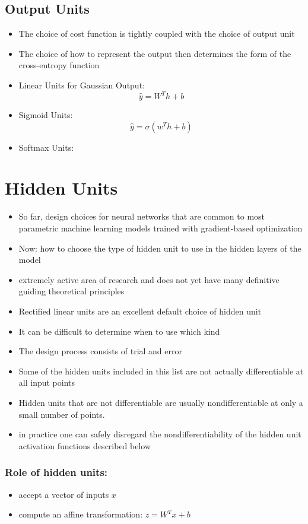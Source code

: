 \documentclass{beamer}
\begin{document}
\subsection{Output Units}
\begin{frame}
	\begin{itemize}
		\item The choice of cost function is tightly coupled with the choice of output unit
		\item The choice of how to represent the output then determines the form of the cross-entropy function
		\item Linear Units for Gaussian Output: 
			$$ \hat{y}= W^Th + b $$
		\item Sigmoid Units: 
			$$\hat{y}=\sigma (w^Th+b) $$
		\item Softmax Units:
		
	\end{itemize}
\end{frame}

\section{Hidden Units}
\begin{frame}
	\begin{itemize}
		\item So far, design choices for neural networks that are common to most parametric machine learning models trained with gradient-based optimization
		\item Now: how to choose the type of hidden unit to use in the hidden layers of the model
		\item  extremely active area of research and does not
yet have many deﬁnitive guiding theoretical principles
\item Rectiﬁed linear units are an excellent default choice of hidden unit
\item It can be diﬃcult to determine when to use which kind
\item The design process consists of trial and error
\item Some of the hidden units included in this list are not actually diﬀerentiable at all input points
\item Hidden units that are not diﬀerentiable are usually nondiﬀerentiable at only a small number of points.
\item in practice one can safely disregard the nondiﬀerentiability of the hidden unit activation functions described below
	\end{itemize}
\end{frame}
\begin{frame}
	\frametitle{Role of hidden units: }
	\begin{itemize}
		\item accept a vector of inputs $x$
		\item compute an affine transformation: $z = W^Tx + b$
	\end{itemize}
	
\end{frame}
\end{document}
